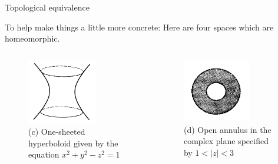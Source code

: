 \documentclass{beamer}
\begin{document}
\begin{frame}{Topological equivalence}
  \begin{block}{}
    To help make things a little more concrete: Here are four spaces which are homeomorphic.
  \end{block}
  \begin{columns}
    \begin{column}{0.5\textwidth}
      \begin{figure}
        \centering
        \includegraphics[width=0.7\textwidth]{figure_1_9_b.png}
        \caption{(c) One-sheeted hyperboloid given by the equation $x^2 + y^2 - z^2 = 1$}
      \end{figure}
    \end{column}
    \begin{column}{0.5\textwidth}
      \begin{figure}
        \centering
        \includegraphics[width=0.7\textwidth]{figure_1_9_c.png}
        \caption{(d) Open annulus in the complex plane specified by $1 < |z| < 3$}
      \end{figure}
    \end{column}
  \end{columns}
\end{frame}
\end{document}
